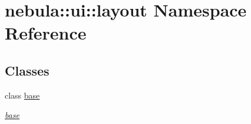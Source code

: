 \hypertarget{namespacenebula_1_1ui_1_1layout}{
\section{nebula::ui::layout Namespace Reference}
\label{namespacenebula_1_1ui_1_1layout}
}
\subsection*{Classes}
\begin{DoxyCompactItemize}
\item 
class \hyperlink{classnebula_1_1ui_1_1layout_1_1base}{base}
\begin{DoxyCompactList}\small\item\em \hyperlink{classnebula_1_1ui_1_1layout_1_1base}{base} \item\end{DoxyCompactList}\end{DoxyCompactItemize}
